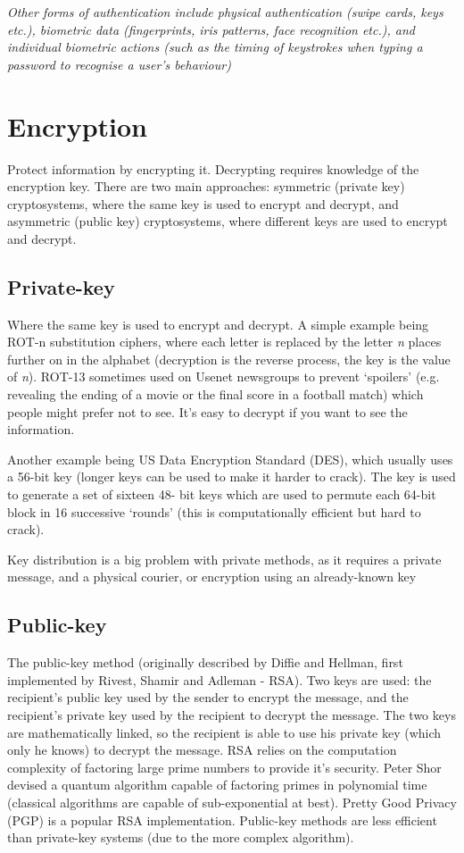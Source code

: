 \documentclass[a4paper,oneside]{report}
\begin{document}
	\noindent\emph{Other forms of authentication include physical authentication (swipe cards, keys etc.), biometric data (fingerprints, iris patterns, face recognition etc.), and individual biometric actions (such as the timing of keystrokes when typing a password to recognise a user's behaviour)}

	\section{Encryption}
	
	Protect information by encrypting it. Decrypting requires knowledge of the encryption key. There are two main approaches: symmetric (private key) cryptosystems, where the same key is used to encrypt and decrypt, and asymmetric (public key) cryptosystems, where different keys are used to encrypt and decrypt.
	
		\subsection{Private-key}
	
		Where the same key is used to encrypt and decrypt. A simple example being ROT-n substitution ciphers, where each letter is replaced by the letter \emph{n} places further on in the alphabet (decryption is the reverse process, the key is the value of \emph{n}). ROT-13 sometimes used on Usenet newsgroups to prevent ‘spoilers’ (e.g. revealing the ending of a movie or the final score in a football match) which people might prefer not to see. It's easy to decrypt if you want to see the information.
		
		Another example being US Data Encryption Standard (DES), which usually uses a 56-bit key (longer keys can be used to make it harder to crack). The key is used to generate a set of sixteen 48- bit keys which are used to permute each 64-bit block in 16 successive ‘rounds’ (this is computationally efficient but hard to crack).
		
		Key distribution is a big problem with private methods, as it requires a private message, and a physical courier, or encryption using an already-known key
	
    	\subsection{Public-key}
    	
    	The public-key method (originally described by Diffie and Hellman, first implemented by Rivest, Shamir and Adleman - RSA). Two keys are used: the recipient's public key used by the sender to encrypt the message, and the recipient's private key used by the recipient to decrypt the message. The two keys are mathematically linked, so the recipient is able to use his private key (which only he knows) to decrypt the message. RSA relies on the computation complexity of factoring large prime numbers to provide it's security. Peter Shor devised a quantum algorithm capable of factoring primes in polynomial time (classical algorithms are capable of sub-exponential at best). Pretty Good Privacy (PGP) is a popular RSA implementation. Public-key methods are less efficient than private-key systems (due to the more complex algorithm).
    	    	
\end{document}
